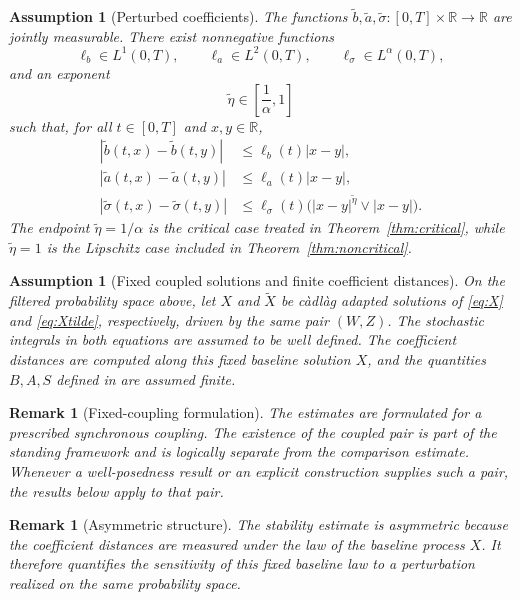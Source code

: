 \documentclass[10pt,a4paper]{amsart}
\newtheorem{remark}[theorem]{Remark}
\newtheorem{assumption}[theorem]{Assumption}
\newcommand{\R}{\mathbb{R}}
\newcommand{\1}{\mathbf{1}}
\newcommand{\wt}{\tilde}
\begin{document}
\begin{assumption}[Perturbed coefficients]\label{ass:perturbed}
The functions $\wt b,\wt a,\wt\sigma:[0,T]\times\R\to\R$ are jointly measurable. There exist nonnegative functions
\[
  \ell_b\in L^1(0,T),\qquad \ell_a\in L^2(0,T),\qquad \ell_\sigma\in L^\alpha(0,T),
\]
and an exponent
\[
  \wt\eta\in\left[\frac1\alpha,1\right]
\]
such that, for all $t\in[0,T]$ and $x,y\in\R$,
\begin{align}
  |\wt b(t,x)-\wt b(t,y)|&\le \ell_b(t)|x-y|, \label{eq:b-lip}\\
  |\wt a(t,x)-\wt a(t,y)|&\le \ell_a(t)|x-y|, \label{eq:a-lip}\\
  |\wt\sigma(t,x)-\wt\sigma(t,y)|&\le \ell_\sigma(t)\bigl(|x-y|^{\wt\eta}\vee |x-y|\bigr). \label{eq:sigma-holder}
\end{align}
The endpoint $\wt\eta=1/\alpha$ is the critical case treated in Theorem~\ref{thm:critical}, while $\wt\eta=1$ is the Lipschitz case included in Theorem~\ref{thm:noncritical}.
\end{assumption}


\begin{assumption}[Fixed coupled solutions and finite coefficient distances]
\label{ass:solutions}
On the filtered probability space above, let $X$ and $\wt X$ be c\`adl\`ag adapted solutions of \eqref{eq:X} and \eqref{eq:Xtilde}, respectively, driven by the same pair $(W,Z)$. The stochastic integrals in both equations are assumed to be well defined. The coefficient distances are computed along this fixed baseline solution $X$, and the quantities $B,A,S$ defined in  are assumed finite.
\end{assumption}

\begin{remark}[Fixed-coupling formulation]
The estimates are formulated for a prescribed synchronous coupling. The existence of the coupled pair is part of the standing framework and is logically separate from the comparison estimate. Whenever a well-posedness result or an explicit construction supplies such a pair, the results below apply to that pair.
\end{remark}

\begin{remark}[Asymmetric structure]
The stability estimate is asymmetric because the coefficient distances are measured under the law of the baseline process $X$. It therefore quantifies the sensitivity of this fixed baseline law to a perturbation realized on the same probability space.
\end{remark}
\end{document}
